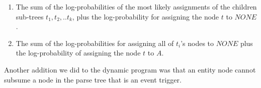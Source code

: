 \begin{enumerate} 
\item The sum of the log-probabilities of the most likely assignments of the children sub-trees $t_1, t_2,.. t_k$, plus the log-probability for assigning the node $t$ to $NONE$.
\item The sum of the log-probabilities for assigning all of $t_i$'s nodes to $NONE$ plus the log-probability of assigning the node $t$ to $A$.
\end{enumerate}

Another addition we did to the dynamic program was that an entity node cannot subsume a node in the parse tree that is an event trigger.